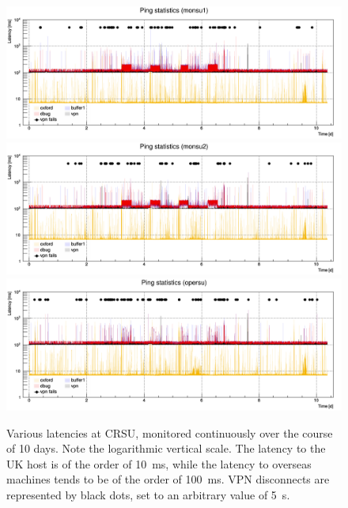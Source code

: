 \documentclass[a4paper,10pt]{article}
\begin{document}
\begin{figure}[htp]
	\centering
	\includegraphics[width=\textwidth]{images/monsu1_latency}\\
	\includegraphics[width=\textwidth]{images/monsu2_latency}\\
	\includegraphics[width=\textwidth]{images/opersu_latency}
	\caption{Various latencies at CRSU, monitored continuously over the course of 10 days. Note the logarithmic vertical scale. The latency to the UK host is of the order of 10~ms, while the latency to overseas machines tends to be of the order of 100~ms. VPN disconnects are represented by black dots, set to an arbitrary value of 5~s.}
	\label{latency_final_1}
\end{figure}
\end{document}
